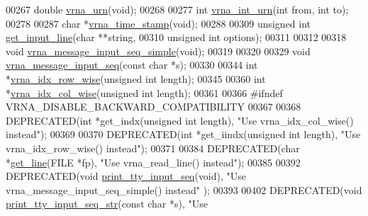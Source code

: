 \begin{DoxyCode}
00267 \textcolor{keywordtype}{double} \hyperlink{group__utils_ga384e256ebb295d04a14426179db0dd6e}{vrna\_urn}(\textcolor{keywordtype}{void});
00268 
00277 \textcolor{keywordtype}{int} \hyperlink{group__utils_ga46111bb3747dbcf4609f0d40ae169ad9}{vrna\_int\_urn}(\textcolor{keywordtype}{int} from, \textcolor{keywordtype}{int} to);
00278 
00287 \textcolor{keywordtype}{char}  *\hyperlink{group__utils_gad3bbe8d01afb1310609cb018d5290550}{vrna\_time\_stamp}(\textcolor{keywordtype}{void});
00288 
00309 \textcolor{keywordtype}{unsigned} \textcolor{keywordtype}{int} \hyperlink{group__utils_ga8ef1835eb83f542396f59f0b205965e5}{get\_input\_line}(\textcolor{keywordtype}{char} **\textcolor{keywordtype}{string},
00310                             \textcolor{keywordtype}{unsigned} \textcolor{keywordtype}{int} options);
00311 
00312 
00318 \textcolor{keywordtype}{void} \hyperlink{group__utils_gaee1dd652ca5b9e56b096963a1576f73b}{vrna\_message\_input\_seq\_simple}(\textcolor{keywordtype}{void});
00319 
00320 
00329 \textcolor{keywordtype}{void} \hyperlink{group__utils_gaf4d194d558b0c975f269de01dea52460}{vrna\_message\_input\_seq}(\textcolor{keyword}{const} \textcolor{keywordtype}{char} *s);
00330 
00344 \textcolor{keywordtype}{int} *\hyperlink{group__utils_ga70b180e9ea764218a82647a1cd347445}{vrna\_idx\_row\_wise}(\textcolor{keywordtype}{unsigned} \textcolor{keywordtype}{int} length);
00345 
00360 \textcolor{keywordtype}{int} *\hyperlink{group__utils_ga89ebc69c52fa0c78c9e1974b0017746b}{vrna\_idx\_col\_wise}(\textcolor{keywordtype}{unsigned} \textcolor{keywordtype}{int} length);
00361 
00366 \textcolor{preprocessor}{#ifndef VRNA\_DISABLE\_BACKWARD\_COMPATIBILITY}
00367 
00368 DEPRECATED(\textcolor{keywordtype}{int}   *get\_indx(\textcolor{keywordtype}{unsigned} \textcolor{keywordtype}{int} length), \textcolor{stringliteral}{"Use vrna\_idx\_col\_wise() instead"});
00369 
00370 DEPRECATED(\textcolor{keywordtype}{int}   *get\_iindx(\textcolor{keywordtype}{unsigned} \textcolor{keywordtype}{int} length), \textcolor{stringliteral}{"Use vrna\_idx\_row\_wise() instead"});
00371 
00384 DEPRECATED(\textcolor{keywordtype}{char}  *\hyperlink{utils_8h_abe51806d14cff0789a8c1df7dbc45b71}{get\_line}(FILE *fp), \textcolor{stringliteral}{"Use vrna\_read\_line() instead"});
00385 
00392 DEPRECATED(\textcolor{keywordtype}{void} \hyperlink{utils_8h_a6bf778117d31b7fd90db435323f4ef74}{print\_tty\_input\_seq}(\textcolor{keywordtype}{void}), \textcolor{stringliteral}{"Use vrna\_message\_input\_seq\_simple() instead"}
      );
00393 
00402 DEPRECATED(\textcolor{keywordtype}{void} \hyperlink{utils_8h_ae4ef89b662a3e9b5b5f0781d9757aba0}{print\_tty\_input\_seq\_str}(\textcolor{keyword}{const} \textcolor{keywordtype}{char} *s), \textcolor{stringliteral}{"Use
}
\end{DoxyCode}
